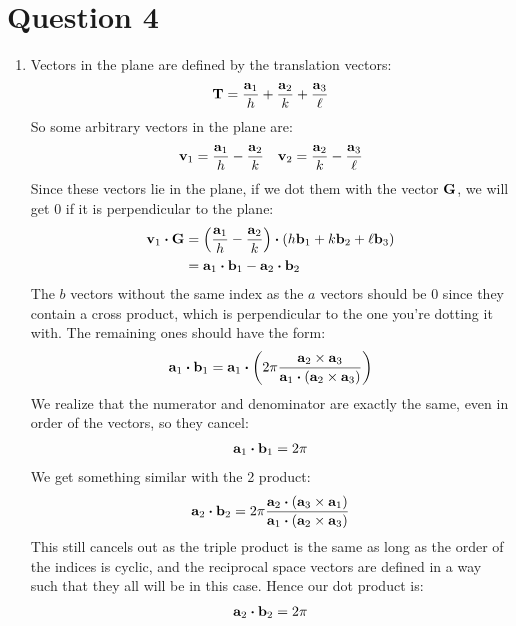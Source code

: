\documentclass[12pt]{article}
\begin{document}
\section*{Question 4}
\begin{enumerate}[label=\alph*)]
\item Vectors in the plane are defined by the translation vectors:
  \begin{align*}
    \vb{T}=\frac{\vb{a}_1}{h}+\frac{\vb{a}_2}{k}+\frac{\vb{a}_3}{\ell}
  \end{align*}
  So some arbitrary vectors in the plane are:
  \begin{align*}
    \vb{v}_1=\frac{\vb{a}_1}{h}-\frac{\vb{a}_2}{k}\quad
    \vb{v}_2=\frac{\vb{a}_2}{k}-\frac{\vb{a}_3}{\ell}
  \end{align*}
  Since these vectors lie in the plane, if we dot them with the vector $\vb{G}$, we will get $0$ if it is perpendicular to the plane:
  \begin{align*}
    \vb{v}_1\vdot\vb{G}&=\qty(\frac{\vb{a}_1}{h}-\frac{\vb{a}_2}{k})\vdot
    \qty(h\vb{b}_1+k\vb{b}_2+\ell\vb{b}_3)\\
    &=\vb{a}_1\vdot\vb{b}_1-\vb{a}_2\vdot\vb{b}_2
  \end{align*}
  The $b$ vectors without the same index as the $a$ vectors should be $0$ since they contain a cross product, which is perpendicular to the one you're dotting it with. The remaining ones should have the form:
  \begin{align*}
    \vb{a}_1\vdot\vb{b}_1=\vb{a}_1\vdot\qty(2\pi\frac{\vb{a}_2\times\vb{a}_3}
    {\vb{a}_1\vdot(\vb{a}_2\times\vb{a}_3)})
  \end{align*}
  We realize that the numerator and denominator are exactly the same, even in order of the vectors, so they cancel:
  \begin{align*}
    \vb{a}_1\vdot\vb{b}_1=2\pi
  \end{align*}
  We get something similar with the 2 product:
  \begin{align*}
    \vb{a}_2\vdot\vb{b}_2=2\pi\frac{\vb{a}_2\vdot(\vb{a}_3\times\vb{a}_1)}
    {\vb{a}_1\vdot(\vb{a}_2\times\vb{a}_3)}
  \end{align*}
  This still cancels out as the triple product is the same as long as the order of the indices is cyclic, and the reciprocal space vectors are defined in a way such that they all will be in this case. Hence our dot product is:
  \begin{align*}
    \vb{a}_2\vdot\vb{b}_2=2\pi
  \end{align*}

\end{enumerate}
\end{document}
